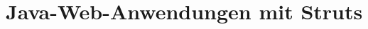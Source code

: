 \section{Java-Web-Anwendungen mit Struts} \label{sec:impl-WebAnwendungen}



















\label{sec:impl-WebAnwendungen-ende}